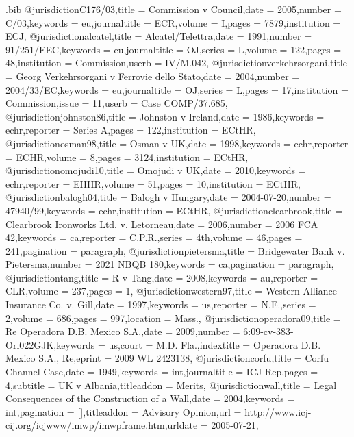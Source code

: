 \begin{filecontents*}[overwrite]{\jobname.bib}
@jurisdiction{C176/03,title = {Commission v Council},date = {2005},number = {C/03},keywords = {eu},journaltitle = {ECR},volume = {I},pages = {7879},institution = {ECJ},}
@jurisdiction{alcatel,title = {Alcatel/Telettra},date = {1991},number = {91\slash 251\slash EEC},keywords = {eu},journaltitle = {OJ},series = {L},volume = {122},pages = {48},institution = {Commission},userb = {IV/M.042},}
@jurisdiction{verkehrsorgani,title = {Georg Verkehrsorgani v Ferrovie dello Stato},date = {2004},number = {2004\slash 33\slash EC},keywords = {eu},journaltitle = {OJ},series = {L},pages = {17},institution = {Commission},issue = {11},userb = {Case COMP\slash 37.685},}
@jurisdiction{johnston86,title = {Johnston v Ireland},date = {1986},keywords = {echr},reporter = {Series A},pages = {122},institution = {ECtHR},}
@jurisdiction{osman98,title = {Osman v UK},date = {1998},keywords = {echr},reporter = {ECHR},volume = {8},pages = {3124},institution = {ECtHR},}
@jurisdiction{omojudi10,title = {Omojudi v UK},date = {2010},keywords = {echr},reporter = {EHHR},volume = {51},pages = {10},institution = {ECtHR},}
@jurisdiction{balogh04,title = {Balogh v Hungary},date = { 2004-07-20},number = {47940/99},keywords = {echr},institution = {ECtHR},}
@jurisdiction{clearbrook,title = {Clearbrook Ironworks Ltd. v. Letorneau},date = {2006},number = {2006 FCA 42},keywords = {ca},reporter = {C.P.R.},series = {4th},volume = {46},pages = {241},pagination = {paragraph},}
@jurisdiction{pietersma,title = {Bridgewater Bank v. Pietersma},number = {2021 NBQB 180},keywords = {ca},pagination = {paragraph},}
@jurisdiction{tang,title = {R v Tang},date = {2008},keywords = {au},reporter = {CLR},volume = {237},pages = {1},}
@jurisdiction{western97,title = {Western Alliance Insurance Co. v. Gill},date = {1997},keywords = {us},reporter = {N.E.},series = {2},volume = {686},pages = {997},location = {Mass.},}
@jurisdiction{operadora09,title = {Re Operadora D.B. Mexico S.A.},date = {2009},number = {6:09-cv-383-Orl022GJK},keywords = {us},court = {M.D. Fla.},indextitle = {Operadora D.B. Mexico S.A., Re},eprint = {2009 WL 2423138},}
@jurisdiction{corfu,title = {Corfu Channel Case},date = {1949},keywords = {int},journaltitle = {ICJ Rep},pages = {4},subtitle = {UK v Albania},titleaddon = {Merits},}
@jurisdiction{wall,title = {Legal Consequences of the Construction of a Wall},date = {2004},keywords = {int},pagination = {[]},titleaddon = {Advisory Opinion},url = {http://www.icj-cij.org/icjwww/imwp/imwpframe.htm},urldate = {2005-07-21},}




\end{filecontents*}




